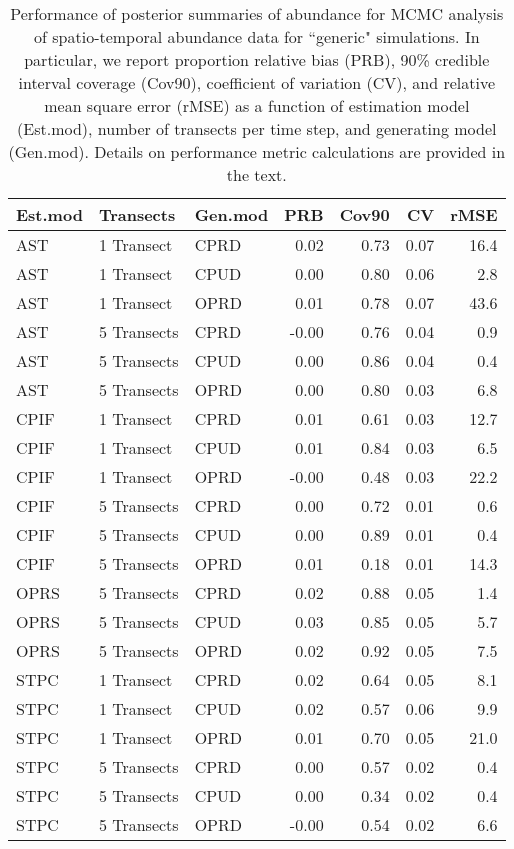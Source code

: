 \documentclass[12pt,fleqn]{article}
\begin{document}
\begin{flushleft}
\begin{table}[ht]
\caption{Performance of posterior summaries of abundance for MCMC analysis of spatio-temporal abundance data for ``generic" simulations.  In particular, we report proportion relative bias (PRB), 90\% credible interval coverage (Cov90), coefficient of variation (CV), and relative mean square error (rMSE) as a function of estimation model (Est.mod), number of transects per time step, and generating model (Gen.mod).  Details on performance metric calculations are provided in the text.}
\label{tab:generic_results}
\centering
\begin{tabular}{lllrrrr}
  \hline
Est.mod & Transects & Gen.mod & PRB & Cov90 & CV & rMSE \\
  \hline
AST & 1 Transect & CPRD & 0.02 & 0.73 & 0.07 & 16.4 \\
  AST & 1 Transect & CPUD & 0.00 & 0.80 & 0.06 & 2.8 \\
  AST & 1 Transect & OPRD & 0.01 & 0.78 & 0.07 & 43.6 \\
  AST & 5 Transects & CPRD & -0.00 & 0.76 & 0.04 & 0.9 \\
  AST & 5 Transects & CPUD & 0.00 & 0.86 & 0.04 & 0.4 \\
  AST & 5 Transects & OPRD & 0.00 & 0.80 & 0.03 & 6.8 \\
  CPIF & 1 Transect & CPRD & 0.01 & 0.61 & 0.03 & 12.7 \\
  CPIF & 1 Transect & CPUD & 0.01 & 0.84 & 0.03 & 6.5 \\
  CPIF & 1 Transect & OPRD & -0.00 & 0.48 & 0.03 & 22.2 \\
  CPIF & 5 Transects & CPRD & 0.00 & 0.72 & 0.01 & 0.6 \\
  CPIF & 5 Transects & CPUD & 0.00 & 0.89 & 0.01 & 0.4 \\
  CPIF & 5 Transects & OPRD & 0.01 & 0.18 & 0.01 & 14.3 \\
  OPRS & 5 Transects & CPRD & 0.02 & 0.88 & 0.05 & 1.4 \\
  OPRS & 5 Transects & CPUD & 0.03 & 0.85 & 0.05 & 5.7 \\
  OPRS & 5 Transects & OPRD & 0.02 & 0.92 & 0.05 & 7.5 \\
  STPC & 1 Transect & CPRD & 0.02 & 0.64 & 0.05 & 8.1 \\
  STPC & 1 Transect & CPUD & 0.02 & 0.57 & 0.06 & 9.9 \\
  STPC & 1 Transect & OPRD & 0.01 & 0.70 & 0.05 & 21.0 \\
  STPC & 5 Transects & CPRD & 0.00 & 0.57 & 0.02 & 0.4 \\
  STPC & 5 Transects & CPUD & 0.00 & 0.34 & 0.02 & 0.4 \\
  STPC & 5 Transects & OPRD & -0.00 & 0.54 & 0.02 & 6.6 \\
   \hline
\end{tabular}
\end{table}


\end{flushleft}
\end{document}
